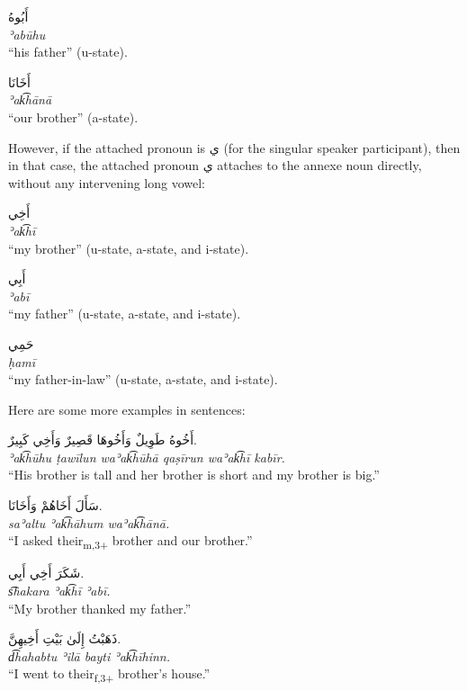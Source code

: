 \documentclass[
  10pt,
]{book}
\begin{document}
\foreignlanguage{arabic}{أَبُوهُ}\\
\emph{ʾabūhu}\\
\enquote{his father} (u-state).

\foreignlanguage{arabic}{أَخَانَا}\\
\emph{ʾak͡hānā}\\
\enquote{our brother} (a-state).

However, if the attached pronoun is \foreignlanguage{arabic}{ي} (for the singular speaker participant), then in that case, the attached pronoun \foreignlanguage{arabic}{ي} attaches to the annexe noun directly, without any intervening long vowel:

\foreignlanguage{arabic}{أَخِي}\\
\emph{ʾak͡hī}\\
\enquote{my brother} (u-state, a-state, and i-state).

\foreignlanguage{arabic}{أَبِي}\\
\emph{ʾabī}\\
\enquote{my father} (u-state, a-state, and i-state).

\foreignlanguage{arabic}{حَمِي}\\
\emph{ḥamī}\\
\enquote{my father-in-law} (u-state, a-state, and i-state).

Here are some more examples in sentences:

\foreignlanguage{arabic}{أَخُوهُ طَوِيلٌ وَأَخُوهَا قَصِيرٌ وَأَخِي کَبِيرٌ.}\\
\emph{ʾak͡hūhu ṭawīlun waʾak͡hūhā qaṣīrun waʾak͡hī kabīr.}\\
\enquote{His brother is tall and her brother is short and my brother is big.}

\foreignlanguage{arabic}{سَأَلَ أَخَاهُمْ وَأَخَانَا.}\\
\emph{saʾaltu ʾak͡hāhum waʾak͡hānā.}\\
\enquote{I asked their\textsubscript{m,3+} brother and our brother.}

\foreignlanguage{arabic}{شَکَرَ أَخِي أَبِي.}\\
\emph{s͡hakara ʾak͡hī ʾabī.}\\
\enquote{My brother thanked my father.}

\foreignlanguage{arabic}{ذَهَبْتُ إِلَىٰ بَيْتِ أَخِيهِنَّ.}\\
\emph{d͡hahabtu ʾilā bayti ʾak͡hīhinn.}\\
\enquote{I went to their\textsubscript{f,3+} brother's house.}
\end{document}
